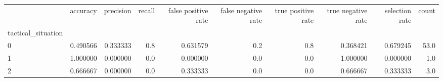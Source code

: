 \begin{tabular}{lrrrrrrrrr}
\toprule
{} &  accuracy &  precision &  recall &  false positive rate &  false negative rate &  true positive rate &  true negative rate &  selection rate &  count \\
tactical\_situation &           &            &         &                      &                      &                     &                     &                 &        \\
\midrule
0                  &  0.490566 &   0.333333 &     0.8 &             0.631579 &                  0.2 &                 0.8 &            0.368421 &        0.679245 &   53.0 \\
1                  &  1.000000 &   0.000000 &     0.0 &             0.000000 &                  0.0 &                 0.0 &            1.000000 &        0.000000 &    1.0 \\
2                  &  0.666667 &   0.000000 &     0.0 &             0.333333 &                  0.0 &                 0.0 &            0.666667 &        0.333333 &    3.0 \\
\bottomrule
\end{tabular}
